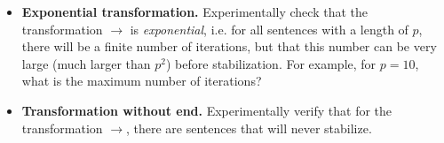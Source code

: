 \documentclass[11pt,class=report,crop=false]{standalone}
\begin{document}
\begin{activite}
\begin{enumerate}
\begin{itemize}
	\item \textbf{Exponential transformation.}
	Experimentally check that the transformation \rzero\run{} $\rightarrow$\run\run\rzero{} is \emph{exponential}, i.e. for all sentences with a length of $p$, there will be a finite number of iterations, but that this number can be very large (much larger than $p^2$) before stabilization. For example, for $p=10$, what is the maximum number of iterations?	

	\item \textbf{Transformation without end.}
	Experimentally verify that for the transformation \rzero\run{} $\rightarrow$\run\run\rzero\rzero{}, there are sentences that will never stabilize.
	\end{itemize}

\end{enumerate}   
     
\end{activite}
\end{document}
